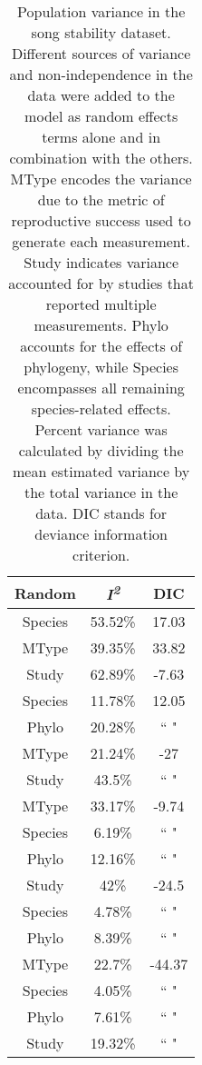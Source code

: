 \documentclass{article}
\begin{document}

\begin{table}[ht]

\centering
\caption{Population variance in the song stability dataset. Different sources of variance and non-independence in  the  data  were  added  to  the  model  as  random  effects  terms  alone  and  in  combination  with  the  others. MType encodes the variance due to the metric of reproductive success used to generate each measurement. Study indicates variance accounted for by studies that reported multiple measurements.  Phylo accounts for the effects of phylogeny, while Species encompasses all remaining species-related effects.  Percent variance was calculated by dividing the mean estimated variance by the total variance in the data.  DIC stands for deviance information criterion.}
\label{fig:Main}
\begin{tabular}{ccc}
  \hline
Random & \textit{I\textsuperscript{2}} & DIC \\ 
  \hline
Species & 53.52\% & 17.03 \\ \hdashline
  MType & 39.35\% & 33.82 \\ \hdashline
  Study & 62.89\% & -7.63 \\ \hdashline
  Species & 11.78\% & 12.05 \\ 
  Phylo & 20.28\% & `` " \\ \hdashline
  MType & 21.24\% & -27 \\ 
  Study & 43.5\% & `` " \\ \hdashline
  MType & 33.17\% & -9.74 \\ 
  Species & 6.19\% & `` " \\ 
  Phylo & 12.16\% & `` " \\ \hdashline
  Study & 42\% & -24.5 \\ 
  Species & 4.78\% & `` " \\ 
  Phylo & 8.39\% & `` " \\ \hdashline
  MType & 22.7\% & -44.37 \\ 
  Species & 4.05\% & `` " \\ 
  Phylo & 7.61\% & `` " \\ 
  Study & 19.32\% & `` " \\ 
   \hline
\end{tabular}
\end{table}
\end{document}
